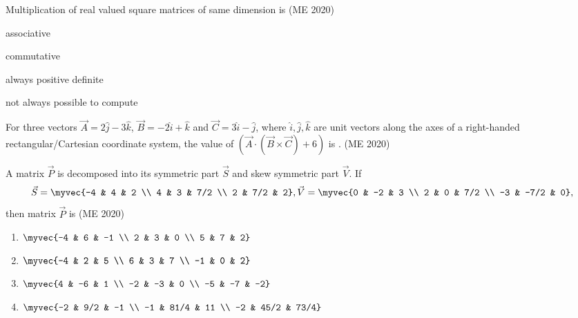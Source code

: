     \item Multiplication of real valued square matrices of same dimension is
	  \hfill (ME 2020)
          \begin{enumerate}
              \begin{multicols}{2}
                  \item associative
                  \item commutative
                  \item always positive definite
                  \item not always possible to compute
              \end{multicols}
          \end{enumerate}
    \item For three vectors $\vec{A} = 2\hat{j} - 3\hat{k}$, $\vec{B} = -2\hat{i} + \hat{k}$ and $\vec{C} = 3\hat{i} - \hat{j}$, where $\hat{i}, \hat{j}, \hat{k}$ are unit vectors along the axes of a right-handed rectangular/Cartesian coordinate system, the value of $\left(\vec{A}\cdot\left(\vec{B}\times\vec{C}\right)+6\right)$ is \underline{\hspace{2cm}}.
	  \hfill (ME 2020)
    \item A matrix $\vec{P}$ is decomposed into its symmetric part $\vec{S}$ and skew symmetric part $\vec{V}$. If
          \[ \vec{S} = \myvec{-4 & 4 & 2 \\ 4 & 3 & 7/2 \\ 2 & 7/2 & 2}, \vec{V} = \myvec{0 & -2 & 3 \\ 2 & 0 & 7/2 \\ -3 & -7/2 & 0}, \]
          then matrix $\vec{P}$ is
	  \hfill (ME 2020)
              \begin{multicols}{2}
          \begin{enumerate}
              \item $\myvec{-4 & 6 & -1 \\ 2 & 3 & 0 \\ 5 & 7 & 2}$
              \item $\myvec{-4 & 2 & 5 \\ 6 & 3 & 7 \\ -1 & 0 & 2}$
              \item $\myvec{4 & -6 & 1 \\ -2 & -3 & 0 \\ -5 & -7 & -2}$
              \item $\myvec{-2 & 9/2 & -1 \\ -1 & 81/4 & 11 \\ -2 & 45/2 & 73/4}$
          \end{enumerate}
  \end{multicols}

